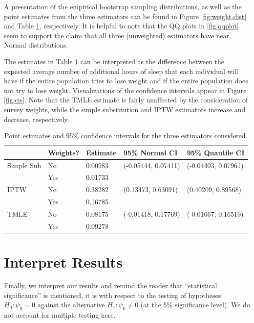 \documentclass{article}
\begin{document}
A presentation of the empirical bootstrap sampling distributions, as well as the point estimates from the three estimators can be found in Figure \ref{fig:weight.dist} and Table \ref{tab:ests}, respectively. It is helpful to note that the QQ plots in \ref{fig:qqplot} seem to support the claim that all three (unweighted) estimators have near Normal distributions. 

The estimates in Table \ref{tab:ests}   can be interpreted as the difference between the expected average number of additional hours of sleep that each individual will have if the entire population tries to lose weight and if the entire population does not try to lose weight. Visualizations of the confidence intervals appear in Figure \ref{fig:cis}. Note that the TMLE estimate is fairly unaffected by the consideration of survey weights, while the simple substitution and IPTW estimators increase and decrease, respectively.

\begin{table}[hbt]
\centering
\begin{tabular}{| l| l | l | l | l |}
  \hline
 & Weights? & Estimate & 95\% Normal CI & 95\% Quantile CI \\ 
  \hline
Simple Sub & No & 0.00983 & (-0.05444, 0.07411) & (-0.04403, 0.07961) \\ 
& Yes & 0.01733 & & \\
\hline
  IPTW & No & 0.38282 & (0.13473, 0.63091) & (0.40209, 0.89568) \\ 
& Yes & 0.16785 & & \\
\hline
  TMLE & No & 0.08175 & (-0.01418, 0.17769) & (-0.01667, 0.16519) \\ 
& Yes & 0.09278 & & \\
   \hline
\end{tabular}
\caption{Point estimates and 95\% confidence intervals for the three estimators considered.}
\label{tab:ests}
\end{table}

\section{Interpret Results}

Finally, we interpret our results and remind the reader that ``statistical significance'' is mentioned, it is with respect to the testing of hypotheses $H_0 : \psi_0 = 0$ against the alternative $H_1 : \psi_{0} \neq 0$ (at the 5\% significance level). We do not account for multiple testing here.
\end{document}

